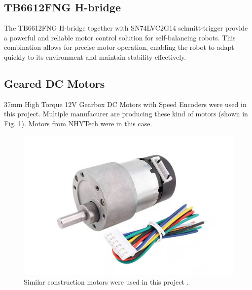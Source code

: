 \documentclass{article}
\begin{document}
\subsection{TB6612FNG H-bridge}
The TB6612FNG H-bridge \cite{TB6612FNG} together with SN74LVC2G14 schmitt-trigger \cite{SN74LVC2G14} provide a powerful and reliable motor control solution for self-balancing robots. This combination allows for precise motor operation, enabling the robot to adapt quickly to its environment and maintain stability effectively.

\subsection{Geared DC Motors}
37mm High Torque 12V Gearbox DC Motors with Speed Encoders were used in this project. Multiple manufacurer are producing these kind of motors (shown in Fig. \ref{fig:dc-motors}). Motors from NHYTech were in this case.

\begin{figure}[h]
    \centering
    \includegraphics[width=0.25\linewidth]{assets/dc-motor-with-encoder.jpg}
    \caption{Similar construction motors were used in this project \cite{dc-motor}.}
    \label{fig:dc-motors}
\end{figure}







\end{document}
